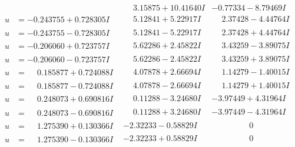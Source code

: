 \documentclass[1p]{elsarticle_modified}
\theoremstyle{definition}
\begin{document}
$$\begin{array}{c|c|c}
 & \phantom{-}3.15875 + 10.41640 I & -0.77334 - 8.79469 I \\ \hline\begin{aligned}
u &= -0.243755 + 0.728305 I\end{aligned}
 & \phantom{-}5.12841 + 5.22917 I & \phantom{-}2.37428 - 4.44764 I \\ \hline\begin{aligned}
u &= -0.243755 - 0.728305 I\end{aligned}
 & \phantom{-}5.12841 - 5.22917 I & \phantom{-}2.37428 + 4.44764 I \\ \hline\begin{aligned}
u &= -0.206060 + 0.723757 I\end{aligned}
 & \phantom{-}5.62286 + 2.45822 I & \phantom{-}3.43259 - 3.89075 I \\ \hline\begin{aligned}
u &= -0.206060 - 0.723757 I\end{aligned}
 & \phantom{-}5.62286 - 2.45822 I & \phantom{-}3.43259 + 3.89075 I \\ \hline\begin{aligned}
u &= \phantom{-}0.185877 + 0.724088 I\end{aligned}
 & \phantom{-}4.07878 + 2.66694 I & \phantom{-}1.14279 - 1.40015 I \\ \hline\begin{aligned}
u &= \phantom{-}0.185877 - 0.724088 I\end{aligned}
 & \phantom{-}4.07878 - 2.66694 I & \phantom{-}1.14279 + 1.40015 I \\ \hline\begin{aligned}
u &= \phantom{-}0.248073 + 0.690816 I\end{aligned}
 & \phantom{-}0.11288 - 3.24680 I & -3.97449 + 4.31964 I \\ \hline\begin{aligned}
u &= \phantom{-}0.248073 - 0.690816 I\end{aligned}
 & \phantom{-}0.11288 + 3.24680 I & -3.97449 - 4.31964 I \\ \hline\begin{aligned}
u &= \phantom{-}1.275390 + 0.130366 I\end{aligned}
 & -2.32233 - 0.58829 I & \phantom{-0.000000 } 0 \\ \hline\begin{aligned}
u &= \phantom{-}1.275390 - 0.130366 I\end{aligned}
 & -2.32233 + 0.58829 I & \phantom{-0.000000 } 0 \\ \hline\begin{aligned}

\end{aligned}
\end{array}$$
\end{document}
